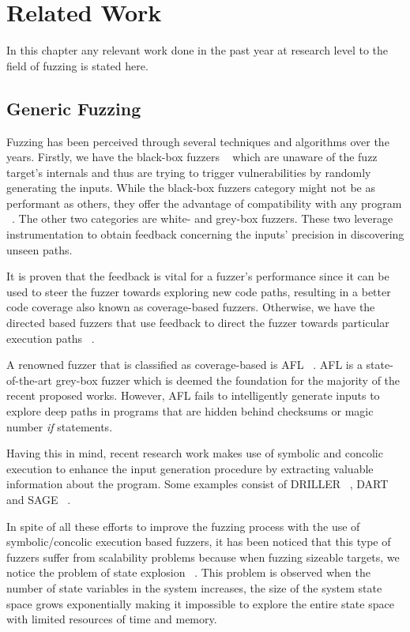 \chapter{Related Work}
\label{sec:relatedwork}
\minitoc
\vspace*{1cm}

In this chapter any relevant work done in the past year at research level to the field of fuzzing is stated here.

\section{Generic Fuzzing}
Fuzzing has been perceived through several techniques and algorithms over the years. Firstly, we have the black-box fuzzers ~\cite{householder2012probability,sparks2007automated,woo2013scheduling} which are unaware of the fuzz target's internals and thus are trying to trigger vulnerabilities by randomly generating the inputs. While the black-box fuzzers category might not be as performant as others, they offer
the advantage of compatibility with any program ~\cite{osterlund2020parmesan,rawat2017vuzzer}. The other two categories are white- and grey-box fuzzers. These two leverage instrumentation to obtain feedback concerning the inputs' precision in discovering unseen paths. 

It is proven that the feedback is vital for a fuzzer's performance since it can be used to steer the fuzzer towards exploring new code paths, resulting in a better code coverage also known as
coverage-based fuzzers. Otherwise, we have the directed based fuzzers that use feedback to direct the fuzzer towards particular execution paths ~\cite{godefroid2005dart}.

A renowned fuzzer that is classified as coverage-based is AFL ~\cite{zalewski2015american}. AFL is a state-of-the-art grey-box fuzzer which is deemed the foundation for the majority of the recent proposed works. However, AFL fails to intelligently generate inputs to explore deep paths in programs that are hidden behind checksums or magic number \emph{if} statements.

Having this in mind, recent research work makes use of symbolic and concolic execution to enhance the input generation procedure by extracting valuable information about the program. Some examples consist of DRILLER ~\cite{stephens2016driller}, DART ~\cite{godefroid2005dart} and SAGE ~\cite{godefroid2012sage}. 

In spite of all these efforts to improve the fuzzing process with the use of symbolic/concolic execution based fuzzers, it has been noticed that this type of fuzzers suffer from scalability problems because when fuzzing sizeable targets, we notice the problem of state explosion ~\cite{Clarke2012}. This problem is observed when the number of state variables in the system increases, the size of the system state space grows exponentially making it impossible to explore the entire state space with limited resources of time and memory.

